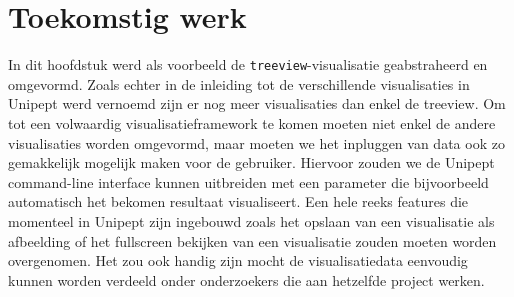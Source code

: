 \section{Toekomstig werk}

In dit hoofdstuk werd als voorbeeld de \texttt{treeview}-visualisatie
geabstraheerd en omgevormd. Zoals echter in de inleiding tot de verschillende
visualisaties in Unipept werd vernoemd zijn er nog meer visualisaties dan enkel
de treeview. Om tot een volwaardig visualisatieframework te komen moeten niet
enkel de andere visualisaties worden omgevormd, maar moeten we het inpluggen van
data ook zo gemakkelijk mogelijk maken voor de gebruiker. Hiervoor zouden we de
Unipept command-line interface kunnen uitbreiden met een parameter die
bijvoorbeeld automatisch het bekomen resultaat visualiseert. Een hele reeks
features die momenteel in Unipept zijn ingebouwd zoals het opslaan van een
visualisatie als afbeelding of het fullscreen bekijken van een visualisatie
zouden moeten worden overgenomen. Het zou ook handig zijn mocht de
visualisatiedata eenvoudig kunnen worden verdeeld onder onderzoekers die aan
hetzelfde project werken.